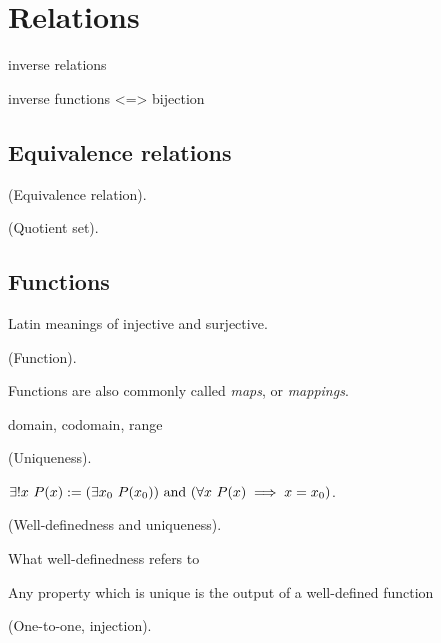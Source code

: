 \newpage

\section{Relations}

inverse relations

inverse functions <=> bijection

\subsection*{Equivalence relations}

\begin{defn}
    (Equivalence relation).
\end{defn}

\begin{defn}
\label{ch::logic_pf_fns::defn::quotient_set}

    (Quotient set).
\end{defn}

\subsection*{Functions}

Latin meanings of injective and surjective.

\begin{defn}
    (Function).
    
    Functions are also commonly called \textit{maps}, or \textit{mappings}.
    
    domain, codomain, range
\end{defn}

\begin{defn}
    (Uniqueness).
    
    $\exists !x \text{ } P(x) := (\exists x_0 \text{ } P(x_0)) \text{ and } (\forall x \text{ } P(x) \implies x = x_0)$.
\end{defn}

\begin{remark}
    (Well-definedness and uniqueness).
    
    What well-definedness refers to
    
    Any property which is unique is the output of a well-defined function
\end{remark}

\begin{defn}
    (One-to-one, injection).
\end{defn}

